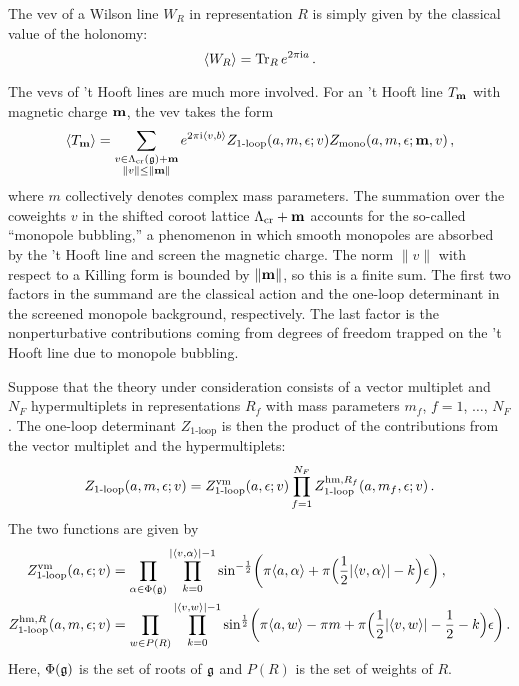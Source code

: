 The vev of a Wilson line $W_R$ in representation $R$ is simply given
by the classical value of the holonomy:
\begin{equation}
  \label{eq:vev-W}
    \langle W_R \rangle = \mathop{\mathrm{Tr}}\nolimits_R e^{2\pi \mathrm{i} a} \,.
\end{equation}

The vevs of 't Hooft lines are much more involved.  For an 't Hooft
line $T_{\mathbf{m}}$ with magnetic charge $\mathbf{m}$, the vev takes the form
\begin{equation}
  \label{eq:vev-T}
  \langle T_{\mathbf{m}} \rangle
  =
  \sum_{\substack{v \in \Lambda_{\mathrm{cr}}(\mathfrak{g}) + \mathbf{m} \\ \|v\| \leq \|\mathbf{m}\|}}
  e^{2\pi \mathrm{i} \langle v, b\rangle}
  Z_{\text{1-loop}}(a,m,\epsilon; v) Z_{\text{mono}}(a,m,\epsilon; \mathbf{m},v) \,,
\end{equation}
where $m$ collectively denotes complex mass parameters.  The summation
over the coweights $v$ in the shifted coroot lattice
$\Lambda_{\mathrm{cr}} + \mathbf{m}$ accounts for the so-called ``monopole
bubbling,'' a phenomenon in which smooth monopoles are absorbed by the
't Hooft line and screen the magnetic charge.  The norm $\|v\|$ with
respect to a Killing form is bounded by $\|\mathbf{m}\|$, so this is a
finite sum.  The first two factors in the summand are the classical
action and the one-loop determinant in the screened monopole
background, respectively.  The last factor is the nonperturbative
contributions coming from degrees of freedom trapped on the 't Hooft
line due to monopole bubbling.

Suppose that the theory under consideration consists of a vector
multiplet and $N_F$ hypermultiplets in representations $R_f$ with mass
parameters $m_f$, $f = 1$, $\dotsc$, $N_F$.  The one-loop determinant
$Z_{\text{1-loop}}$ is then the product of the contributions from the
vector multiplet and the hypermultiplets:
\begin{equation}
  Z_{\text{1-loop}}(a,m,\epsilon; v)
  =
  Z_{\text{1-loop}}^{\mathrm{vm}}(a,\epsilon; v)
  \prod_{f=1}^{N_F} Z_{\text{1-loop}}^{\mathrm{hm}, R_f}(a,m_f,\epsilon; v) \,.
\end{equation}
The two functions are given by
\begin{align}
  Z_{\text{1-loop}}^{\mathrm{vm}}(a,\epsilon; v)
  &=\prod_{\alpha \in \Phi(\mathfrak{g})} \prod_{k=0}^{|\langle v, \alpha\rangle| - 1}
    \sin^{-\frac12}
    \biggl(\pi\langle a, \alpha\rangle + \pi\Big(\frac12 |\langle v, \alpha\rangle| - k\Bigr)\epsilon\biggr) \,,
  \\  
  Z_{\text{1-loop}}^{\mathrm{hm}, R}(a,m,\epsilon; v)
  &=\prod_{w \in P(R)}\prod_{k=0}^{|\langle v, w\rangle| - 1}
    \sin^{\frac12}\biggl(\pi \langle a, w\rangle - \pi m
    + \pi\Bigl(\frac12|\langle v, w\rangle| - \frac12 - k\Bigr)\epsilon\biggr) \,.
\end{align}
Here, $\Phi(\mathfrak{g})$ is the set of roots of $\mathfrak{g}$ and $P(R)$ is the set
of weights of $R$.

